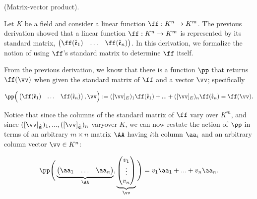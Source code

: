 \begin{deriv}
\label{ch::lin_alg::deriv::matrix_vector_product}
    (Matrix-vector product).
    
    Let $K$ be a field and consider a linear function $\ff:K^n \rightarrow K^m$. The previous derivation showed that a linear function $\ff:K^n \rightarrow K^m$ is represented by its standard matrix, $\begin{pmatrix} \ff(\see_1) & \hdots & \ff(\see_n) \end{pmatrix}$. In this derivation, we formalize the notion of using $\ff$'s standard matrix to determine $\ff$ itself.
    
    From the previous derivation, we know that there is a function $\pp$ that returns $\ff(\vv)$ when given the standard matrix of $\ff$ and a vector $\vv$; specifically
    
    \begin{align*}
        \pp\Big( \begin{pmatrix} \ff(\see_1) & \hdots & \ff(\see_n) \end{pmatrix}, \vv \Big) := ([\vv]_E)_1 \ff(\see_1) + ... + ([\vv]_E)_n \ff(\see_n) = \ff(\vv).
    \end{align*}
    
    Notice that since the columns of the standard matrix of $\ff$ vary over $K^m$, and since $([\vv]_\sE)_1, ..., ([\vv]_\sE)_n$ vary\footnotemark over $K$, we can now restate the action of $\pp$ in terms of an arbitrary $m \times n$ matrix $\AA$ having $i$th column $\aa_i$ and an arbitrary column vector $\vv \in K^n$:
    
    
    \begin{align*}
        \pp\Bigg(
            \underbrace
            {\begin{pmatrix} 
                \aa_1 & \hdots & \aa_n
            \end{pmatrix}}_\AA,
            \underbrace{
            \begin{pmatrix} 
                v_1 \\ \vdots \\ v_n 
            \end{pmatrix}}_\vv
            \Bigg)
            =
            v_1 \aa_1 + ... + v_n \aa_n.
    \end{align*}
    

\end{deriv}

